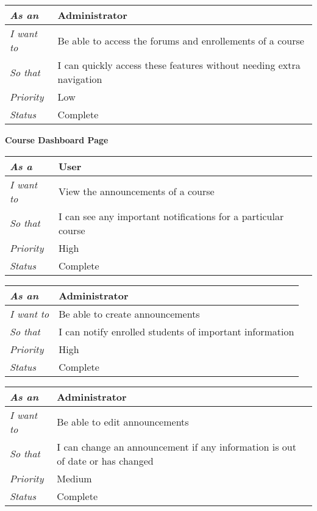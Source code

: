 \begin{table}[h!]
    \begin{tabular}{|l|l|}
        \hline
        \textit{As an} & Administrator \\ \hline
        \textit{I want to} & Be able to access the forums and enrollements of a course \\ \hline
        \textit{So that} & I can quickly access these features without needing extra navigation \\ \hline
        \textit{Priority} & {\color[HTML]{3166FF} Low} \\ \hline
        \textit{Status} & Complete \\ \hline
    \end{tabular}
\end{table}

\pagebreak
\FloatBarrier
\textbf{Course Dashboard Page}
\FloatBarrier
\begin{table}[h!]
    \begin{tabular}{|l|l|}
        \hline
        \textit{As a} & User \\ \hline
        \textit{I want to} & View the announcements of a course \\ \hline
        \textit{So that} & I can see any important notifications for a particular course \\ \hline
        \textit{Priority} & {\color[HTML]{FE0000} High} \\ \hline
        \textit{Status} & Complete \\ \hline
    \end{tabular}
\end{table}

\begin{table}[h!]
    \begin{tabular}{|l|l|}
        \hline
        \textit{As an} & Administrator \\ \hline
        \textit{I want to} & Be able to create announcements \\ \hline
        \textit{So that} & I can notify enrolled students of important information \\ \hline
        \textit{Priority} & {\color[HTML]{FE0000} High} \\ \hline
        \textit{Status} & Complete \\ \hline
    \end{tabular}
\end{table}

\begin{table}[h!]
    \begin{tabular}{|l|l|}
        \hline
        \textit{As an} & Administrator \\ \hline
        \textit{I want to} & Be able to edit announcements \\ \hline
        \textit{So that} & I can change an announcement if any information is out of date or has changed \\ \hline
        \textit{Priority} & {\color[HTML]{FE996B} Medium} \\ \hline
        \textit{Status} & Complete \\ \hline
    \end{tabular}
\end{table}

